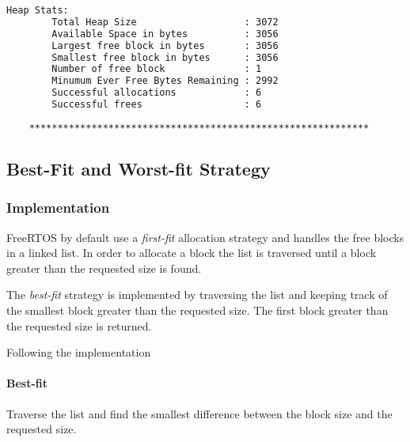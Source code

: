     \begin{outputbox}
    \begin{lstlisting}[language=bash]   
    Heap Stats:
        Total Heap Size                   : 3072
        Available Space in bytes          : 3056
        Largest free block in bytes       : 3056
        Smallest free block in bytes      : 3056
        Number of free block              : 1
        Minumum Ever Free Bytes Remaining : 2992
        Successful allocations            : 6
        Successful frees                  : 6
    
    ************************************************************
    \end{lstlisting}
    \end{outputbox}

\subsection{Best-Fit and Worst-fit Strategy}
    \subsubsection{Implementation}
    FreeRTOS by default use a \textit{first-fit} allocation strategy and handles the free blocks in a linked list. In order to allocate a block the list is traversed until a block greater than the requested size is found. 

    The \textit{best-fit} strategy is implemented by traversing the list and keeping track of the smallest block greater than the requested size. The first block greater than the requested size is returned.

    Following the implementation

    \paragraph{Best-fit} Traverse the list and find the smallest difference between the block size and the requested size.

